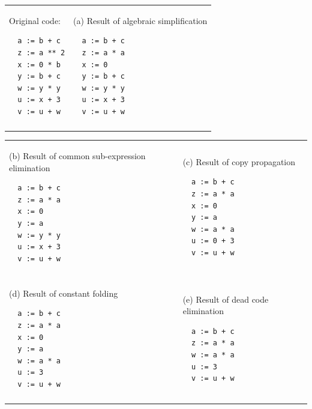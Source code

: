 \documentclass[11pt]{article}
\begin{document}
\begin{enumerate}
\begin{tabular}{|l|l|} \hline
\begin{minipage}[t]{3in}
Original code:
\begin{verbatim}
  a := b + c
  z := a ** 2
  x := 0 * b
  y := b + c
  w := y * y
  u := x + 3
  v := u + w
\end{verbatim}
\end{minipage}
&
\begin{minipage}[t]{3in}
(a) Result of algebraic simplification
\begin{verbatim}
  a := b + c
  z := a * a
  x := 0
  y := b + c
  w := y * y
  u := x + 3
  v := u + w
\end{verbatim}
\end{minipage}
\\ & \\ \hline
\end{tabular}
\begin{tabular}{|l|l|}
\hline
\begin{minipage}[t]{3in}
(b) Result of common sub-expression elimination
\begin{verbatim}
  a := b + c
  z := a * a
  x := 0
  y := a
  w := y * y
  u := x + 3
  v := u + w
\end{verbatim}
\end{minipage}
&
\begin{minipage}[t]{3in}
(c) Result of copy propagation
\begin{verbatim}
  a := b + c
  z := a * a
  x := 0
  y := a
  w := a * a
  u := 0 + 3
  v := u + w
\end{verbatim}
\end{minipage}
\\ & \\ \hline
\begin{minipage}[t]{3in}
(d) Result of constant folding
\begin{verbatim}
  a := b + c
  z := a * a
  x := 0
  y := a
  w := a * a
  u := 3
  v := u + w
\end{verbatim}
\end{minipage}
&
\begin{minipage}[t]{3in}
(e) Result of dead code elimination
\begin{verbatim}
  a := b + c
  z := a * a
  w := a * a
  u := 3
  v := u + w
\end{verbatim}
\end{minipage}
\\ & \\
\hline
\end{tabular}


\end{enumerate}
\end{document}
